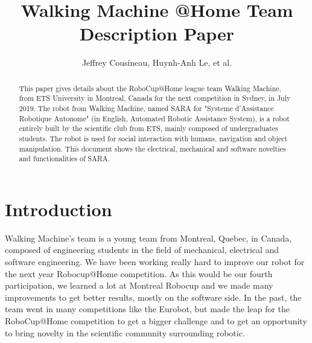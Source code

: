 \documentclass[runningheads,a4paper]{llncs}
\begin{document}
\newif\ifdraft
\draftfalse


\ifdraft
\setlength{\belowcaptionskip}{-5pt}
\fi

\title{Walking Machine @Home \newline {} Team Description Paper}

\author{Jeffrey Cousineau, Huynh-Anh Le, et al.}
\maketitle



\begin{abstract}

This paper gives details about the RoboCup@Home league team Walking Machine, from ETS University in Montreal, Canada for the next competition in Sydney, in July 2019. The robot from Walking Machine, named SARA for "Systeme d'Assistance Robotique Autonome" (in English, Automated Robotic Assistance System), is a robot entirely built by the scientific club from ETS, mainly composed of undergraduates students. The robot is used for social interaction with humans, navigation and object manipulation. This document shows the electrical, mechanical and software novelties and functionalities of SARA.

\end{abstract}


\section{Introduction}
\tab Walking Machine’s team is a young team from Montreal, Quebec, in Canada, composed of engineering students in the field of mechanical, electrical and software engineering. We have been working really hard to improve our robot for the next year Robocup@Home competition. As this would be our fourth participation, we learned a lot at Montreal Robocup and we made many improvements to get better results, mostly on the software side. In the past, the team went in many competitions like the Eurobot, but made the leap for the RoboCup@Home competition to get a bigger challenge and to get an opportunity to bring novelty in the scientific community surrounding robotic. \\
\end{document}
